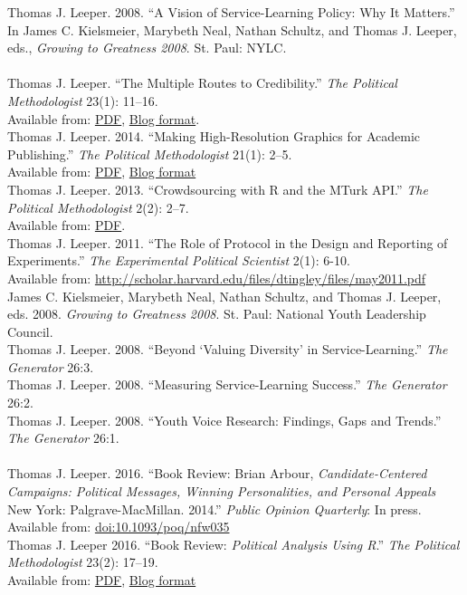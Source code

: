 \documentclass[12pt]{article}
\newcommand{\topic}[1]{\pagebreak[3]\indent {\color{lg}{\footnotesize #1 }}\\}
\newcommand{\entry}[1]{\indent {\color{lg}\guillemotright}\hspace{2pt}#1\vspace{.25em}\\}
\begin{document}
	\entry{Thomas J. Leeper. 2008. ``A Vision of Service-Learning Policy: Why It Matters.'' In James C. Kielsmeier, Marybeth Neal, Nathan Schultz, and Thomas J. Leeper, eds., \textit{Growing to Greatness 2008}. St. Paul: NYLC.}
\topic{Other Academic Publications}
	\entry{Thomas J. Leeper. ``The Multiple Routes to Credibility.'' \textit{The Political Methodologist} 23(1): 11--16.\\ Available from: \href{https://thepoliticalmethodologist.files.wordpress.com/2016/02/tpm_v23_n1.pdf}{PDF}, \href{https://thepoliticalmethodologist.com/2015/12/21/the-multiple-routes-to-credibility/}{Blog format}.}
	\entry{Thomas J. Leeper. 2014. ``Making High-Resolution Graphics for Academic Publishing.'' \textit{The Political Methodologist} 21(1): 2--5.\\ Available from: \href{https://thepoliticalmethodologist.files.wordpress.com/2014/06/tpm_v21_n12.pdf}{PDF}, \href{https://thepoliticalmethodologist.com/2013/11/25/making-high-resolution-graphics-for-academic-publishing/}{Blog format}}
	\entry{Thomas J. Leeper. 2013. ``Crowdsourcing with R and the MTurk API.'' \textit{The Political Methodologist} 2(2): 2--7.\\ Available from: \href{https://thepoliticalmethodologist.files.wordpress.com/2013/09/tpm_v20_n21.pdf}{PDF}.}
	\entry{Thomas J. Leeper. 2011. ``The Role of Protocol in the Design and Reporting of Experiments.'' \textit{The Experimental Political Scientist} 2(1): 6-10.\\ Available from: \url{http://scholar.harvard.edu/files/dtingley/files/may2011.pdf}}
	\entry{James C. Kielsmeier, Marybeth Neal, Nathan Schultz, and Thomas J. Leeper, eds. 2008. \textit{Growing to Greatness 2008}. St. Paul: National Youth Leadership Council.}
	\entry{Thomas J. Leeper. 2008. ``Beyond `Valuing Diversity' in Service-Learning.'' \textit{The Generator} 26:3.}
	\entry{Thomas J. Leeper. 2008. ``Measuring Service-Learning Success.'' \textit{The Generator} 26:2.}
	\entry{Thomas J. Leeper. 2008. ``Youth Voice Research: Findings, Gaps and Trends.'' \textit{The Generator} 26:1.}
\topic{Book Reviews}
	\entry{Thomas J. Leeper. 2016. ``Book Review: Brian Arbour, \textit{Candidate-Centered Campaigns: Political Messages, Winning Personalities, and Personal Appeals} New York: Palgrave-MacMillan. 2014.'' \textit{Public Opinion Quarterly}: In press. Available from: \href{http://dx.doi.org/10.1093/poq/nfw035}{doi:10.1093/poq/nfw035}}
	\entry{Thomas J. Leeper 2016. ``Book Review: \textit{Political Analysis Using R}.'' \textit{The Political Methodologist} 23(2): 17--19.\\ Available from: \href{https://thepoliticalmethodologist.files.wordpress.com/2016/08/tpm_v23_n2.pdf}{PDF}, \href{https://thepoliticalmethodologist.com/2016/05/25/book-review-political-analysis-using-r/}{Blog format}}
\end{document}
